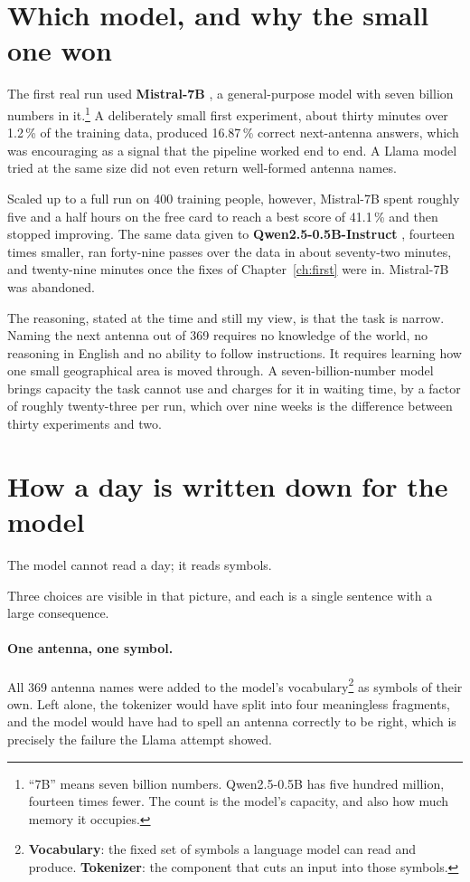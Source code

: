 \section{Which model, and why the small one won}
\label{sec:tools-model}

The first real run used \textbf{Mistral-7B} \cite{jiang2023mistral}, a
general-purpose model with seven billion numbers in it.\footnote{``7B'' means
seven billion numbers. Qwen2.5-0.5B has five hundred million, fourteen times
fewer. The count is the model's capacity, and also how much memory it occupies.}
A deliberately small first experiment, about thirty minutes over 1.2\,\% of the
training data, produced 16.87\,\% correct next-antenna answers, which was
encouraging as a signal that the pipeline worked end to end. A Llama model tried
at the same size did not even return well-formed antenna names.

Scaled up to a full run on 400 training people, however, Mistral-7B spent roughly
five and a half hours on the free card to reach a best score of 41.1\,\% and then
stopped improving. The same data given to \textbf{Qwen2.5-0.5B-Instruct}
\cite{qwen2025}, fourteen times smaller, ran forty-nine passes over the data in
about seventy-two minutes, and twenty-nine minutes once the fixes of
Chapter~\ref{ch:first} were in. Mistral-7B was abandoned.

The reasoning, stated at the time and still my view, is that the task is narrow.
Naming the next antenna out of 369 requires no knowledge of the world, no
reasoning in English and no ability to follow instructions. It requires learning
how one small geographical area is moved through. A seven-billion-number model
brings capacity the task cannot use and charges for it in waiting time, by a
factor of roughly twenty-three per run, which over nine weeks is the difference
between thirty experiments and two.

\section{How a day is written down for the model}

The model cannot read a day; it reads symbols.



Three choices are visible in that picture, and each is a single sentence with a
large consequence.

\paragraph{One antenna, one symbol.} All 369 antenna names were added to the
model's vocabulary\footnote{\textbf{Vocabulary}: the fixed set of symbols a
language model can read and produce. \textbf{Tokenizer}: the component that cuts
an input into those symbols.} as symbols of their own. Left alone, the tokenizer
would have split  into four meaningless fragments, and the model
would have had to spell an antenna correctly to be right, which is precisely the
failure the Llama attempt showed.

